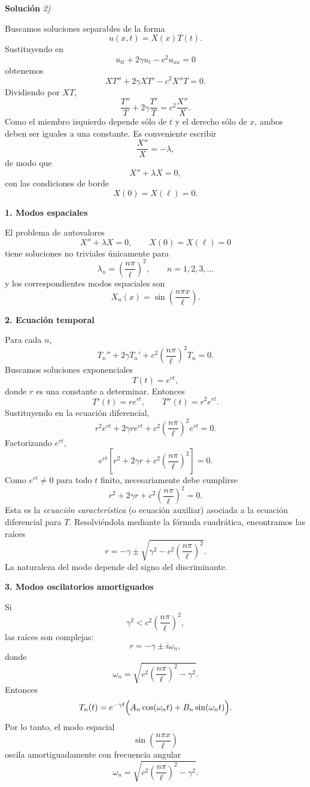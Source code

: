 \documentclass[11pt,spanish]{article}
\newcounter{problema}
\begin{document}
\vspace{0.5cm}
{\bf Soluci\'on }{\em 2)}
\vspace{0.5cm}

Buscamos soluciones separables de la forma
$$
u(x,t)=X(x)T(t).
$$
Sustituyendo en
$$
u_{tt}+2\gamma u_t-c^2u_{xx}=0
$$
obtenemos
$$
XT''+2\gamma XT'-c^2X''T=0.
$$
Dividiendo por $XT$,
$$
\frac{T''}{T}+2\gamma\frac{T'}{T}
=
c^2\frac{X''}{X}.
$$
Como el miembro izquierdo depende sólo de $t$ y el derecho sólo de $x$, ambos deben ser iguales a una constante. Es conveniente escribir
$$
\frac{X''}{X}=-\lambda,
$$
de modo que
$$
X''+\lambda X=0,
$$
con las condiciones de borde
$$
X(0)=X(\ell)=0.
$$

{\bf 1. Modos espaciales}

El problema de autovalores
$$
X''+\lambda X=0,
\qquad
X(0)=X(\ell)=0
$$
tiene soluciones no triviales únicamente para
$$
\lambda_n=\left(\frac{n\pi}{\ell}\right)^2,
\qquad n=1,2,3,\ldots
$$
y los correspondientes modos espaciales son
$$
X_n(x)=\sin\left(\frac{n\pi x}{\ell}\right).
$$

{\bf 2. Ecuación temporal}

Para cada $n$,
$$
T_n''+2\gamma T_n'
+c^2\left(\frac{n\pi}{\ell}\right)^2T_n=0.
$$
Buscamos soluciones exponenciales
$$
T(t)=e^{rt},
$$
donde $r$ es una constante a determinar.
Entonces
$$
T'(t)=re^{rt},
\qquad
T''(t)=r^2e^{rt}.
$$
Sustituyendo en la ecuación diferencial,
$$
r^2e^{rt}
+
2\gamma re^{rt}
+
c^2\left(\frac{n\pi}{\ell}\right)^2e^{rt}
=0.
$$
Factorizando $e^{rt}$,
$$
e^{rt}
\left[
r^2+2\gamma r
+c^2\left(\frac{n\pi}{\ell}\right)^2
\right]
=0.
$$
Como $e^{rt}\neq 0$ para todo $t$ finito, necesariamente debe cumplirse
$$
\boxed{
r^2+2\gamma r
+c^2\left(\frac{n\pi}{\ell}\right)^2=0.
}
$$
Esta es la {\em ecuación característica} (o ecuación auxiliar) asociada a la ecuación diferencial para $T$.
Resolviéndola mediante la fórmula cuadrática, encontramos las raíces $$
r=-\gamma
\pm
\sqrt{
\gamma^2
-c^2\left(\frac{n\pi}{\ell}\right)^2
}.
$$
La naturaleza del modo depende del signo del discriminante.

{\bf 3. Modos oscilatorios amortiguados}

Si
$$
\gamma^2
<
c^2\left(\frac{n\pi}{\ell}\right)^2,
$$
las raíces son complejas:
$$
r=-\gamma\pm i\omega_n,
$$
donde
$$
\omega_n
=
\sqrt{
c^2\left(\frac{n\pi}{\ell}\right)^2
-\gamma^2
}.
$$
Entonces
$$
T_n(t)
=
e^{-\gamma t}
\Bigl(
A_n\cos(\omega_n t)
+
B_n\sin(\omega_n t)
\Bigr).
$$
Por lo tanto, el modo espacial
$$
\sin\left(\frac{n\pi x}{\ell}\right)
$$
oscila amortiguadamente con frecuencia angular
$$
\boxed{
\omega_n
=
\sqrt{
c^2\left(\frac{n\pi}{\ell}\right)^2
-\gamma^2
}.
}
$$
\end{document}
